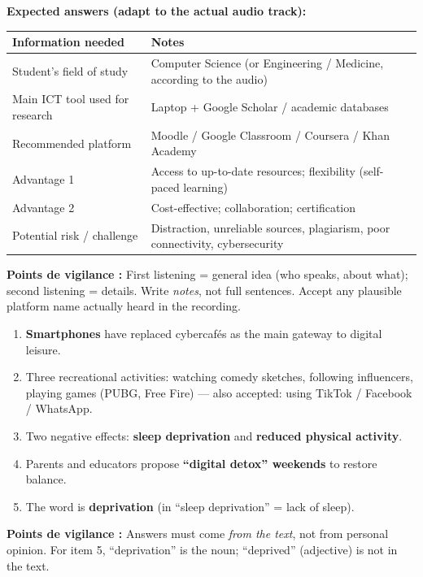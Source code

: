 \documentclass[11pt]{article}
\begin{document}
\begin{corrige}
\textbf{Expected answers (adapt to the actual audio track):}
\begin{center}
\begin{tabularx}{\linewidth}{|l|X|}\hline
\textbf{Information needed} & \textbf{Notes} \\\hline
Student's field of study & Computer Science (or Engineering / Medicine, according to the audio) \\\hline
Main ICT tool used for research & Laptop + Google Scholar / academic databases \\\hline
Recommended platform & Moodle / Google Classroom / Coursera / Khan Academy \\\hline
Advantage 1 & Access to up-to-date resources; flexibility (self-paced learning) \\\hline
Advantage 2 & Cost-effective; collaboration; certification \\\hline
Potential risk / challenge & Distraction, unreliable sources, plagiarism, poor connectivity, cybersecurity \\\hline
\end{tabularx}
\end{center}
\textbf{Points de vigilance :} First listening = general idea (who speaks, about what); second listening = details. Write \emph{notes}, not full sentences. Accept any plausible platform name actually heard in the recording.
\end{corrige}

\begin{corrige}
\begin{enumerate}
\item \textbf{Smartphones} have replaced cybercafés as the main gateway to digital leisure.
\item Three recreational activities: watching comedy sketches, following influencers, playing games (PUBG, Free Fire) — also accepted: using TikTok / Facebook / WhatsApp.
\item Two negative effects: \textbf{sleep deprivation} and \textbf{reduced physical activity}.
\item Parents and educators propose \textbf{``digital detox'' weekends} to restore balance.
\item The word is \textbf{deprivation} (in ``sleep deprivation'' = lack of sleep).
\end{enumerate}
\textbf{Points de vigilance :} Answers must come \emph{from the text}, not from personal opinion. For item 5, ``deprivation'' is the noun; ``deprived'' (adjective) is not in the text.
\end{corrige}
\end{document}
